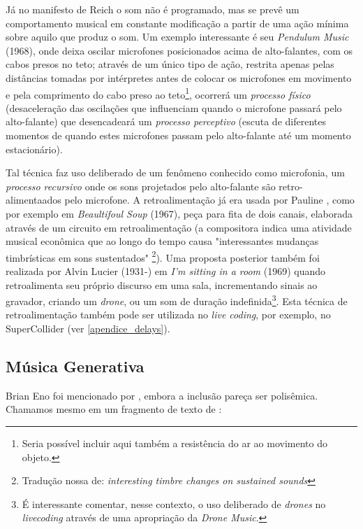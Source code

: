 Já no manifesto de Reich o som não é programado, mas se prevê um comportamento musical em constante modificação a partir de uma ação mínima sobre aquilo que produz o som. Um exemplo interessante é seu \emph{Pendulum Music} (1968), onde deixa oscilar microfones posicionados acima de alto-falantes, com os cabos presos no teto; através de um único tipo de ação, restrita apenas pelas distâncias tomadas por intérpretes antes de colocar os microfones em movimento e pela comprimento do cabo preso ao teto\footnote{Seria possível incluir aqui também a resistência do ar ao movimento do objeto.}, ocorrerá um \emph{processo físico} (desaceleração das oscilações que influenciam quando o microfone passará pelo alto-falante) que desencadeará um \emph{processo perceptivo} (escuta de diferentes momentos de quando estes microfones passam pelo alto-falante até um momento estacionário). 

Tal técnica faz uso deliberado de um fenômeno conhecido como microfonia, um \emph{processo recursivo} onde os sons projetados pelo alto-falante são retro-alimentaados pelo microfone. A retroalimentação já era usada por Pauline , como por exemplo em \emph{Beaultifoul Soup} (1967), peça para fita de dois canais, elaborada através de um circuito em retroalimentação (a compositora indica uma atividade musical econômica que ao longo do tempo causa "interessantes mudanças timbrísticas em sons sustentados" \footnote{ Tradução nossa de: \emph{interesting timbre changes on sustained sounds}}). Uma proposta posterior também foi realizada por Alvin Lucier (1931-) em \emph{I'm sitting in a room} (1969) quando retroalimenta seu próprio discurso em uma sala, incrementando sinais ao gravador, criando um \emph{drone}, ou um som de duração indefinida\footnote{É interessante comentar, nesse contexto, o uso deliberado de \emph{drones} no \emph{livecoding} através de uma apropriação da \emph{Drone Music}.}. Esta técnica de retroalimentação também pode ser utilizada no \emph{live coding}, por exemplo, no SuperCollider (ver \autoref{apendice_delays}).

\subsection{Música Generativa}\label{sec:alg_complexo}

Brian Eno foi mencionado por , embora a inclusão pareça ser polisêmica. Chamamos  mesmo em um fragmento de texto de :

